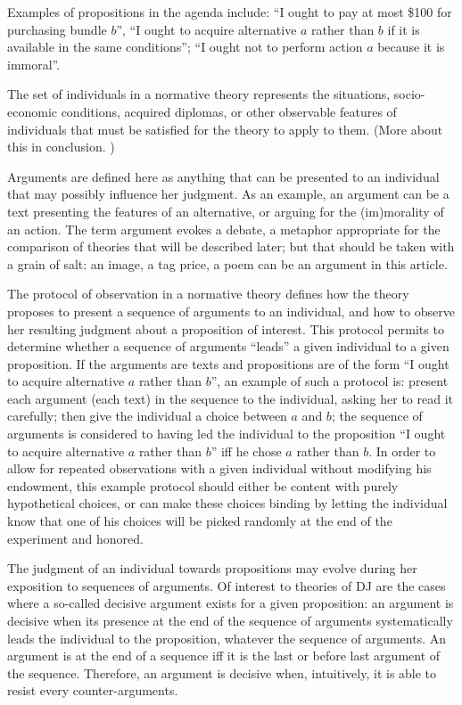 \documentclass[version=last, pagesize, twoside=off, bibliography=totoc, DIV=calc, fontsize=12pt, a4paper, french, english]{scrartcl}
\begin{document}
Examples of propositions in the agenda include: “I ought to pay at most \$100 for purchasing bundle $b$”, “I ought to acquire alternative $a$ rather than $b$ if it is available in the same conditions”; “I ought not to perform action $a$ because it is immoral”.

The set of individuals in a normative theory represents the situations, socio-economic conditions, acquired diplomas, or other observable features of individuals that must be satisfied for the theory to apply to them. (More about this in conclusion. \TODO{})

Arguments are defined here as anything that can be presented to an individual that may possibly influence her judgment. As an example, an argument can be a text presenting the features of an alternative, or arguing for the (im)morality of an action. The term argument evokes a debate, a metaphor appropriate for the comparison of theories that will be described later; but that should be taken with a grain of salt: an image, a tag price, a poem can be an argument in this article. 

The protocol of observation in a normative theory defines how the theory proposes to present a sequence of arguments to an individual, and how to observe her resulting judgment about a proposition of interest. This protocol permits to determine whether a sequence of arguments “leads” a given individual to a given proposition. If the arguments are texts and propositions are of the form “I ought to acquire alternative $a$ rather than $b$”, an example of such a protocol is: present each argument (each text) in the sequence to the individual, asking her to read it carefully; then give the individual a choice between $a$ and $b$; the sequence of arguments is considered to having led the individual to the proposition “I ought to acquire alternative $a$ rather than $b$” iff he chose $a$ rather than $b$.
In order to allow for repeated observations with a given individual without modifying his endowment, this example protocol should either be content with purely hypothetical choices, or can make these choices binding by letting the individual know that one of his choices will be picked randomly at the end of the experiment and honored.

The judgment of an individual towards propositions may evolve during her exposition to sequences of arguments. Of interest to theories of \ac{DJ} are the cases where a so-called decisive argument exists for a given proposition: an argument is decisive when its presence at the end of the sequence of arguments systematically leads the individual to the proposition, whatever the sequence of arguments. An argument is at the end of a sequence iff it is the last or before last argument of the sequence. Therefore, an argument is decisive when, intuitively, it is able to resist every counter-arguments. 
\end{document}
